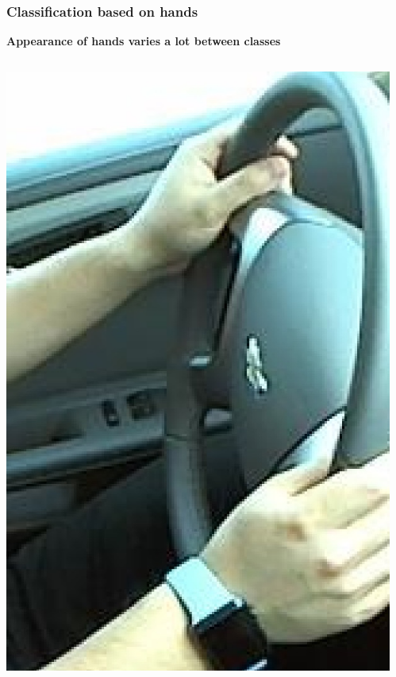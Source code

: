 \documentclass{beamer}
\begin{document}
	\begin{frame}
		\frametitle{Classification based on hands}
        \textbf{Appearance of hands varies a lot between classes}
		\begin{columns}
			\begin{column}{0.5\textwidth}
				\begin{center}			
					\includegraphics[height=0.5\textheight]{handpose_example_3_cut}\\			
				\end{center}
			\end{column}
			\begin{column}{0.5\textwidth}
				\begin{center}			

\end{center}
\end{column}
\end{columns}
\end{frame}
\end{document}
